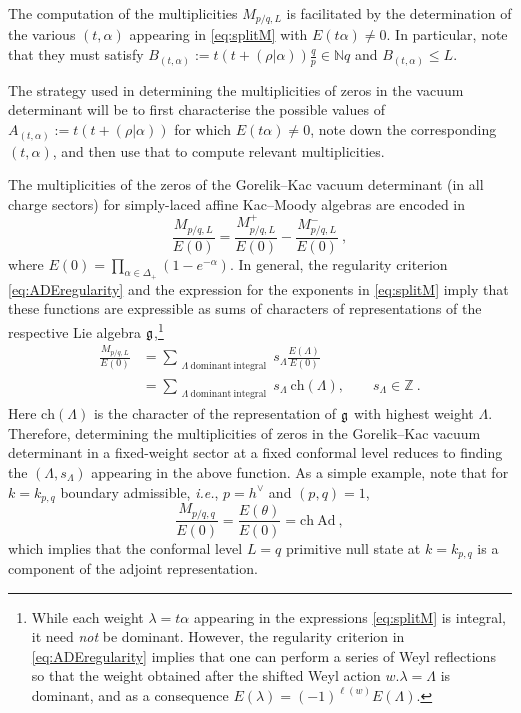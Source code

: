 The computation of the multiplicities $M_{p/q,L}$ is facilitated by the determination of the various $(t,\alpha)$ appearing in \eqref{eq:splitM} with $E(t\alpha) \neq 0$. In particular, note that they must satisfy $B_{(t,\alpha)} := t(t+(\rho|\alpha)) \frac{q}{p} \in \mathbb{N}q$ and $B_{(t,\alpha)} \leqslant L$. 

The strategy used in determining the multiplicities of zeros in the vacuum determinant will be to first characterise the possible values of $A_{(t,\alpha)} := t(t+(\rho|\alpha))$ for which $E(t\alpha)\neq0$, note down the corresponding $(t,\alpha)$, and then use that to compute relevant multiplicities. 

The multiplicities of the zeros of the Gorelik--Kac vacuum determinant (in all charge sectors) for simply-laced affine Kac--Moody algebras are encoded in
\begin{equation}
    \frac{M_{p/q,L}}{E(0)} = \frac{M^+_{p/q,L}}{E(0)} - \frac{M^-_{p/q,L}}{E(0)}~,
\end{equation}
where $E(0) = \prod_{\alpha \in \Delta_+}(1-e^{-\alpha})$. In general, the regularity criterion \eqref{eq:ADEregularity} and the expression for the exponents in \eqref{eq:splitM} imply that these functions are expressible as sums of characters of representations of the respective Lie algebra $\mathfrak{g}$,\footnote{While each weight $\lambda = t\alpha$ appearing in the expressions \eqref{eq:splitM} is integral, it need \emph{not} be dominant. However, the regularity criterion in \eqref{eq:ADEregularity} implies that one can perform a series of Weyl reflections so that the weight obtained after the shifted Weyl action $w.\lambda = \Lambda$ is dominant, and as a consequence $E(\lambda) = (-1)^{\ell(w)} E(\Lambda)$.} 
\begin{equation} \label{eq:expinchar}
\begin{split}
    \frac{M_{p/q,L}}{E(0)} &= \sum_{\substack{\Lambda \ \mathrm{dominant} \ \mathrm{integral} }} s_\Lambda \frac{E(\Lambda)}{E(0)}\\ &=\sum_{\substack{\Lambda \ \mathrm{dominant} \ \mathrm{integral} }} s_\Lambda~\mathrm{ch}(\Lambda), \qquad s_\Lambda \in \mathbb{Z}~. 
\end{split}
\end{equation}
Here $\mathrm{ch}(\Lambda)$ is the character of the representation of $\mathfrak{g}$ with highest weight $\Lambda$. Therefore, determining the multiplicities of zeros in the Gorelik--Kac vacuum determinant in a fixed-weight sector at a fixed conformal level reduces to finding the $(\Lambda, s_\Lambda)$ appearing in the above function. As a simple example, note that for $k = k_{p,q}$ boundary admissible, \emph{i.e.}, $p = h^\vee$ and $(p,q) = 1$,
\begin{equation}
    \frac{M_{p/q,q}}{E(0)} = \frac{E(\theta)}{E(0)} = \mathrm{ch}~\mathrm{Ad}~,
\end{equation}
which implies that the conformal level $L = q$ primitive null state at $k = k_{p,q}$ is a component of the adjoint representation. 